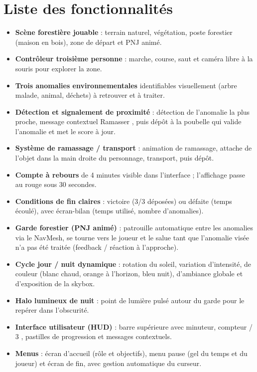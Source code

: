\documentclass[11pt,a4paper]{article}
\begin{document}
\section{Liste des fonctionnalités}
\begin{itemize}
  \item \textbf{Scène forestière jouable} : terrain naturel, végétation, poste
        forestier (maison en bois), zone de départ et PNJ animé.
  \item \textbf{Contrôleur troisième personne} : marche, course, saut et caméra
        libre à la souris pour explorer la zone.
  \item \textbf{Trois anomalies environnementales} identifiables visuellement
        (arbre malade, animal, déchets) à retrouver et à traiter.
  \item \textbf{Détection et signalement de proximité} : détection de l'anomalie
        la plus proche, message contextuel \og [E] Ramasser \fg{}, puis dépôt à la
        poubelle qui valide l'anomalie et met le score à jour.
  \item \textbf{Système de ramassage / transport} : animation de ramassage,
        attache de l'objet dans la main droite du personnage, transport, puis dépôt.
  \item \textbf{Compte à rebours} de 4 minutes visible dans l'interface ;
        l'affichage passe au rouge sous 30 secondes.
  \item \textbf{Conditions de fin claires} : victoire (3/3 déposées) ou défaite
        (temps écoulé), avec écran-bilan (temps utilisé, nombre d'anomalies).
  \item \textbf{Garde forestier (PNJ animé)} : patrouille automatique entre les
        anomalies via le NavMesh, se tourne vers le joueur et le salue tant que
        l'anomalie visée n'a pas été traitée (feedback / réaction à l'approche).
  \item \textbf{Cycle jour / nuit dynamique} : rotation du soleil, variation
        d'intensité, de couleur (blanc chaud, orange à l'horizon, bleu nuit),
        d'ambiance globale et d'exposition de la skybox.
  \item \textbf{Halo lumineux de nuit} : point de lumière pulsé autour du garde
        pour le repérer dans l'obscurité.
  \item \textbf{Interface utilisateur (HUD)} : barre supérieure avec minuteur,
        compteur  / 3 \fg{}, pastilles de progression et messages contextuels.
  \item \textbf{Menus} : écran d'accueil (rôle et objectifs), menu pause (gel du
        temps et du joueur) et écran de fin, avec gestion automatique du curseur.
\end{itemize}
\end{document}
